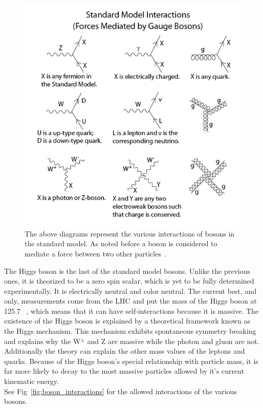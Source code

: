   \begin{figure}[h]
\begin{center}
\includegraphics[width=0.8\linewidth]{Figs/SM_force_mediation.png}
\caption{\label{fig:sm_force_meidation}
 The above diagrams represent the various interactions of bosons in the standard model. As noted before a boson is considered to mediate a force between two other particles~\cite{wikimediations}.
}
\end{center}
\end{figure}
 
 The Higgs boson is the last of the standard model bosons. Unlike the previous ones, it is theorized to be a zero spin scalar, which is yet to be fully determined experimentally. It is electrically neutral and color neutral. The current best, and only, measurements come from the LHC and put the mass of the Higgs boson at 125.7 \GeVcc~\cite{discovery, higgstwiki}, which means that it can have self-interactions because it is massive. The existence of the Higgs boson is explained by a theoretical framework known as the Higgs mechanism. This mechanism exhibits spontaneous symmetry breaking and explains why the W$^{\pm}$ and Z are massive while the photon and gluon are not. Additionally the theory can explain the other mass values of the leptons and quarks. Because of the Higgs boson's special relationship with particle mass, it is far more likely to decay to the most massive particles allowed by it's current kinematic energy.\\ 
 
 
 See Fig~\ref{fig:boson_interactions} for the allowed interactions of the various bosons.
 
